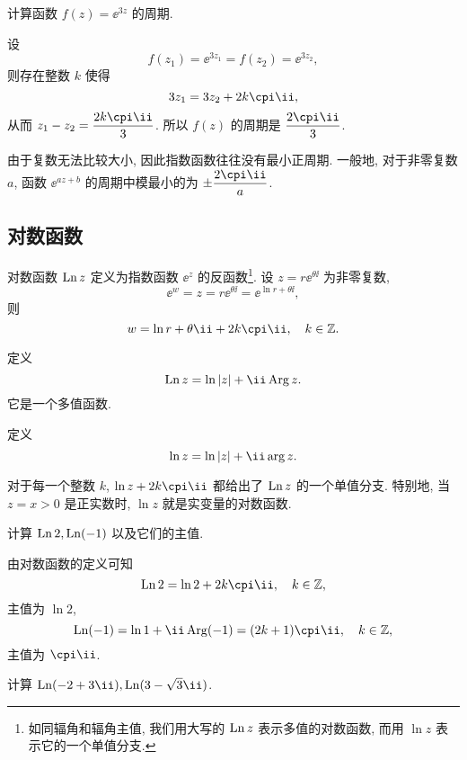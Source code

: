 \begin{example}
  计算函数 $f(z)=\ee^{3z}$ 的周期.
\end{example}

\begin{solution}
  设
  \[
     f(z_1)=\ee^{3z_1}
    =f(z_2)=\ee^{3z_2},
  \]
  则存在整数 $k$ 使得
  \[
    3z_1=3z_2+2k\cpi\ii,
  \]
  从而 $z_1-z_2=\dfrac{2k\cpi\ii}3$.
  所以 $f(z)$ 的周期是 $\dfrac{2\cpi\ii}3$.
\end{solution}

由于复数无法比较大小, 因此指数函数往往没有最小正周期.
一般地, 对于非零复数 $a$, 函数 $\ee^{az+b}$ 的周期中模最小的为 $\pm\dfrac{2\cpi\ii}a$.


\subsection{对数函数}

对数函数 $\operatorname{Ln} z$ 定义为指数函数 $\ee^z$ 的反函数\footnote{%
  如同辐角和辐角主值, 我们用大写的 $\operatorname{Ln} z$ 表示多值的对数函数, 而用 $\ln z$ 表示它的一个单值分支.
}.
设 $z=r\ee^{\theta \ii}$ 为非零复数,
\[
  \ee^w=z=r\ee^{\theta \ii}=\ee^{\ln r+\theta \ii},
\]
则
\[
  w=\ln r+\theta\ii+2k\cpi\ii,\quad k\in\BZ.
\]

\begin{definition}
  \begin{enuma}
    \item 定义
      \[
        \Ln z=\ln\abs{z}+\ii\Arg z.
      \]
      它是一个多值函数.
    \item 定义
      \[
        \ln z=\ln\abs{z}+\ii\arg z.
      \]
  \end{enuma}
\end{definition}

对于每一个整数 $k$, $\ln z+2k\cpi\ii$ 都给出了 $\operatorname{Ln} z$ 的一个单值分支.
特别地, 当 $z=x>0$ 是正实数时, $\ln z$ 就是实变量的对数函数.

\begin{example}
  计算 $\operatorname{Ln} 2,\operatorname{Ln}(-1)$ 以及它们的主值.
\end{example}

\begin{solution}
  由对数函数的定义可知
  \[
    \Ln2=\ln2+2k\cpi\ii,\quad k\in\BZ,
  \]
  主值为 $\ln 2$,
  \[
    \Ln(-1)=\ln1+\ii\Arg(-1)=(2k+1)\cpi\ii,\quad k\in\BZ,
  \]
  主值为 $\cpi\ii$.
\end{solution}

\begin{example}
  计算 $\Ln(-2+3\ii),\Ln(3-\sqrt3 \ii)$.
\end{example}

